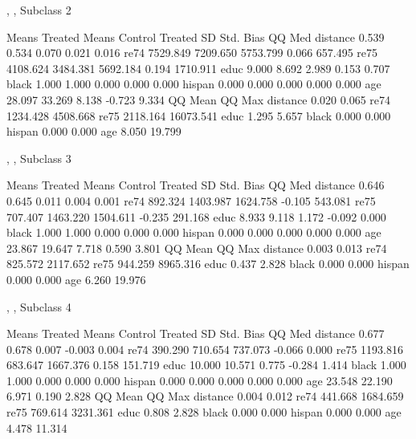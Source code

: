 \documentclass[oneside,letterpaper,titlepage]{article}
\begin{document}
\begin{Schunk}
\begin{Soutput}
, , Subclass 2

         Means Treated Means Control Treated SD Std. Bias    QQ Med
distance         0.539         0.534      0.070     0.021     0.016
re74          7529.849      7209.650   5753.799     0.066   657.495
re75          4108.624      3484.381   5692.184     0.194  1710.911
educ             9.000         8.692      2.989     0.153     0.707
black            1.000         1.000      0.000     0.000     0.000
hispan           0.000         0.000      0.000     0.000     0.000
age             28.097        33.269      8.138    -0.723     9.334
           QQ Mean    QQ Max
distance     0.020     0.065
re74      1234.428  4508.668
re75      2118.164 16073.541
educ         1.295     5.657
black        0.000     0.000
hispan       0.000     0.000
age          8.050    19.799

, , Subclass 3

         Means Treated Means Control Treated SD Std. Bias    QQ Med
distance         0.646         0.645      0.011     0.004     0.001
re74           892.324      1403.987   1624.758    -0.105   543.081
re75           707.407      1463.220   1504.611    -0.235   291.168
educ             8.933         9.118      1.172    -0.092     0.000
black            1.000         1.000      0.000     0.000     0.000
hispan           0.000         0.000      0.000     0.000     0.000
age             23.867        19.647      7.718     0.590     3.801
           QQ Mean    QQ Max
distance     0.003     0.013
re74       825.572  2117.652
re75       944.259  8965.316
educ         0.437     2.828
black        0.000     0.000
hispan       0.000     0.000
age          6.260    19.976

, , Subclass 4

         Means Treated Means Control Treated SD Std. Bias    QQ Med
distance         0.677         0.678      0.007    -0.003     0.004
re74           390.290       710.654    737.073    -0.066     0.000
re75          1193.816       683.647   1667.376     0.158   151.719
educ            10.000        10.571      0.775    -0.284     1.414
black            1.000         1.000      0.000     0.000     0.000
hispan           0.000         0.000      0.000     0.000     0.000
age             23.548        22.190      6.971     0.190     2.828
           QQ Mean    QQ Max
distance     0.004     0.012
re74       441.668  1684.659
re75       769.614  3231.361
educ         0.808     2.828
black        0.000     0.000
hispan       0.000     0.000
age          4.478    11.314


\end{Soutput}
\end{Schunk}
\end{document}
